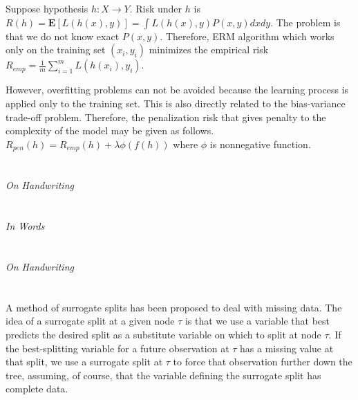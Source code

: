 \documentclass[11pt,a4paper]{article}
\begin{document}
\section{}

Suppose hypothesis \(h : X \rightarrow Y\). Risk under \(h\) is \(R(h)=\mathbf{E}[L(h(x), y)]=\int L(h(x), y)P(x, y)dxdy\). The problem is that we do not know exact \(P(x, y)\). Therefore, ERM algorithm which works only on the training set \((x_i, y_i)\) minimizes the empirical risk \(R_{emp} = \frac{1}{m}\sum_{i=1}^{m}L(h(x_i), y_i)\).

However, overfitting problems can not be avoided because the learning process is applied only to the training set. This is also directly related to the bias-variance trade-off problem. Therefore, the penalization risk that gives penalty to the complexity of the model may be given as follows. \( R_{pen}(h)= R_{emp}(h) + \lambda \phi(f(h))\) where \(\phi\) is nonnegative function.

\section{}

\emph{On Handwriting}

\section{}

\emph{In Words}

\section{}

\emph{On Handwriting}

\section{}

A method of surrogate splits has been proposed to deal with missing data. The idea of a surrogate split at a given node \(\tau\) is that we use a variable that best predicts the desired split as a substitute variable on which to split at node \(\tau\). If the best-splitting variable for a future observation at \(\tau\) has a missing value at that split, we use a surrogate split at \(\tau\) to force that observation further down the tree, assuming, of course, that the variable defining the surrogate split has complete data.
\end{document}

